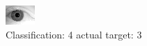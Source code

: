 \begin{figure}[h!]
\begin{center}
\includegraphics[width=0.60\columnwidth]{figures/ID2068_class_4_target_3.png}
\end{center}
\caption{ Classification: 4 actual target: 3}
\label{fig:ID2068_class_4_target_3}
\end{figure}
